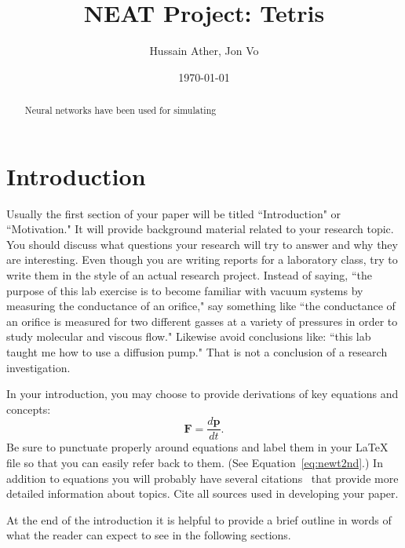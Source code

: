 \documentclass[aps,prd,reprint]{revtex4-1}
\begin{document}
\title{NEAT Project: Tetris}

\author{Hussain Ather, Jon Vo}

\date{\today}

\begin{abstract}
Neural networks have been used for simulating 
\end{abstract}

\maketitle

\section{Introduction}\label{sec:intro}

Usually the first section of your paper will be titled ``Introduction" or ``Motivation."  It will provide background material related to your research topic.  You should discuss what questions your research will try to answer and why they are interesting.  Even though you are writing reports for a laboratory class, try to write them in the style of an actual research project.  Instead of saying, ``the purpose of this lab exercise is to become familiar with vacuum systems by measuring the conductance of an orifice," say something like ``the conductance of an orifice is measured for two different gasses at a variety of pressures in order to study molecular and viscous flow."  Likewise avoid conclusions like: ``this lab taught me how to use a diffusion pump."  That is not a conclusion of a research investigation.

In your introduction, you may choose to provide derivations of key equations and concepts:
\begin{equation}\label{eq:newt2nd}
\mathbf{F} = \frac{d\mathbf{p}}{dt}.
\end{equation}
Be sure to punctuate properly around equations and label them in your \LaTeX{} file so that you can easily refer back to them.  (See Equation~\ref{eq:newt2nd}.)  In addition to equations you will probably have several citations~\cite{ref:apaper} that provide more detailed information about topics.  Cite all sources used in developing your paper.

At the end of the introduction it is helpful to provide a brief outline in words of what the reader can expect to see in the following sections.
\end{document}
